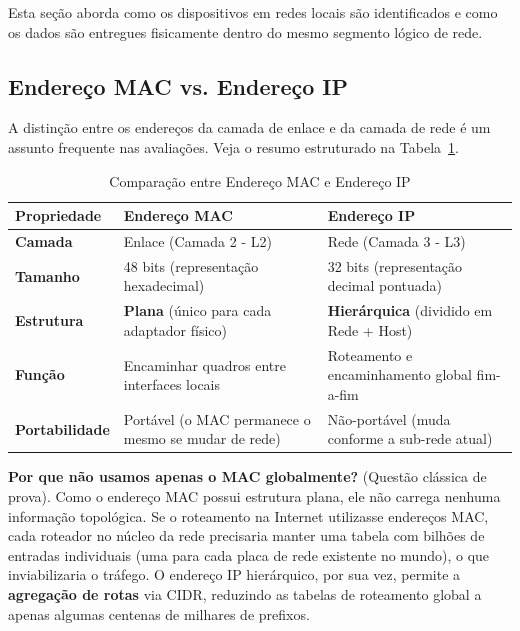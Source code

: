 \documentclass[11pt,a4paper]{article}
\begin{document}
Esta seção aborda como os dispositivos em redes locais são identificados e como os dados são entregues fisicamente dentro do mesmo segmento lógico de rede.

\subsection{Endereço MAC vs. Endereço IP}

A distinção entre os endereços da camada de enlace e da camada de rede é um assunto frequente nas avaliações. Veja o resumo estruturado na Tabela~\ref{tab:mac_vs_ip}.

\begin{table}[h!]
\centering
\caption{Comparação entre Endereço MAC e Endereço IP}
\label{tab:mac_vs_ip}
\begin{tabularx}{\textwidth}{lXX}
\toprule
\textbf{Propriedade} & \textbf{Endereço MAC} & \textbf{Endereço IP} \\
\midrule
\textbf{Camada} & Enlace (Camada 2 - L2) & Rede (Camada 3 - L3) \\
\textbf{Tamanho} & 48 bits (representação hexadecimal) & 32 bits (representação decimal pontuada) \\
\textbf{Estrutura} & \textbf{Plana} (único para cada adaptador físico) & \textbf{Hierárquica} (dividido em Rede + Host) \\
\textbf{Função} & Encaminhar quadros entre interfaces locais & Roteamento e encaminhamento global fim-a-fim \\
\textbf{Portabilidade} & Portável (o MAC permanece o mesmo se mudar de rede) & Não-portável (muda conforme a sub-rede atual) \\
\bottomrule
\end{tabularx}
\end{table}

\begin{reflexao}
\textbf{Por que não usamos apenas o MAC globalmente?} (Questão clássica de prova). Como o endereço MAC possui estrutura plana, ele não carrega nenhuma informação topológica. Se o roteamento na Internet utilizasse endereços MAC, cada roteador no núcleo da rede precisaria manter uma tabela com bilhões de entradas individuais (uma para cada placa de rede existente no mundo), o que inviabilizaria o tráfego. O endereço IP hierárquico, por sua vez, permite a \textbf{agregação de rotas} via CIDR, reduzindo as tabelas de roteamento global a apenas algumas centenas de milhares de prefixos.
\end{reflexao}
\end{document}
